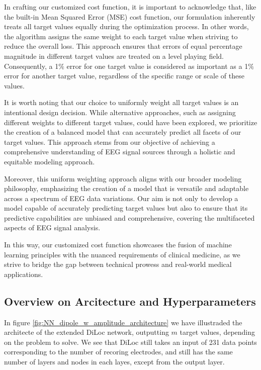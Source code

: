 \documentclass[a4paper, UKenglish, 11pt]{uiomaster}
\begin{document}
In crafting our customized cost function, it is important to acknowledge that, like the built-in Mean Squared Error (MSE) cost function, our formulation inherently treats all target values equally during the optimization process. In other words, the algorithm assigns the same weight to each target value when striving to reduce the overall loss. This approach ensures that errors of equal percentage magnitude in different target values are treated on a level playing field. Consequently, a 1$\%$ error for one target value is considered as important as a 1$\%$ error for another target value, regardless of the specific range or scale of these values.

It is worth noting that our choice to uniformly weight all target values is an intentional design decision. While alternative approaches, such as assigning different weights to different target values, could have been explored, we prioritize the creation of a balanced model that can accurately predict all facets of our target values. This approach stems from our objective of achieving a comprehensive understanding of EEG signal sources through a holistic and equitable modeling approach.

Moreover, this uniform weighting approach aligns with our broader modeling philosophy, emphasizing the creation of a model that is versatile and adaptable across a spectrum of EEG data variations. Our aim is not only to develop a model capable of accurately predicting target values but also to ensure that its predictive capabilities are unbiased and comprehensive, covering the multifaceted aspects of EEG signal analysis.

In this way, our customized cost function showcases the fusion of machine learning principles with the nuanced requirements of clinical medicine, as we strive to bridge the gap between technical prowess and real-world medical applications.


\subsection{Overview on Arcitecture and Hyperparameters}
In figure \ref{fig:NN_dipole_w_amplitude_architecture} we have illustraded the architecte of the extended DiLoc network, outputting $m$ target values, depending on the problem to solve. We see that DiLoc still takes an input of 231 data points corresponding to the number of recoring electrodes, and still has the same number of layers and nodes in each layes, except from the output layer.
\end{document}
